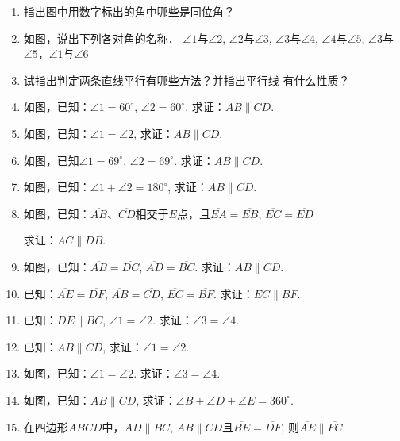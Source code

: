 \begin{ex}
\begin{enumerate}
    \item 指出图中用数字标出的角中哪些是同位角？
    \item 如图，说出下列各对角的名称．
    $\angle 1$与$\angle 2$, $\angle 2$与$\angle 3$, $\angle 3$与$\angle 4$, $\angle 4$与$\angle 5$, $\angle 3$与
    $\angle 5$，$\angle 1$与$\angle 6$
    \item 试指出判定两条直线平行有哪些方法？并指出平行线
    有什么性质？
    \item 如图，已知：$\angle 1=60^{\circ}$, $\angle 2=60^{\circ}$. 
    求证：$AB\parallel CD$.

    \item 如图，已知：$\angle 1=\angle 2$, 求证：$AB\parallel CD$.
    \item 如图，已知$\angle 1=69^{\circ}$, $\angle 2=69^{\circ}$.
    求证：$AB\parallel CD$.
    \item 如图，已知：$\angle 1+\angle 2=180^{\circ}$, 求证：$AB\parallel CD$.
    \item 如图，已知：$\overline{AB}$、$\overline{CD}$相交于$E$点，且$\overline{EA}=\overline{EB}$, $\overline{EC}=\overline{ED}$
    
求证：$AC\parallel DB$.

\item 如图，已知：$\overline{AB}=\overline{DC}$, $\overline{AD}=\overline{BC}$. 求证：$AB\parallel CD$.
\item 已知：$\overline{AE}=\overline{DF}$, $\overline{AB}=\overline{CD}$, $\overline{EC}=\overline{BF}$. 
求证：$EC\parallel BF$.
\item 已知：$DE\parallel BC$, $\angle 1=\angle 2$. 求证：$\angle 3=\angle 4$.
\item 已知：$AB\parallel CD$, 求证：$\angle 1=\angle 2$.
\item 如图，已知：$\angle 1=\angle 2$. 求证：$\angle 3=\angle 4$.
\item 如图，已知：$AB\parallel CD$, 
求证：$\angle B+\angle D+\angle E=360^{\circ}$.

\item 在四边形$ABCD$中，$AD\parallel BC$, $AB\parallel CD$且$\overline{BE}=\overline{DF}$, 则$\overline{AE}\parallel \overline{FC}$.
\end{enumerate}
\end{ex}

